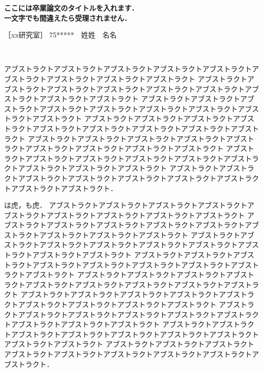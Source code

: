 \documentclass[a4paper,fleqn,12pt]{jreport}
\begin{document}
\begin{center}
\fontsize{16pt}{0pt}\selectfont
{\gtfamily\bfseries ここには卒業論文のタイトルを入れます．\\ 一文字でも間違えたら受理されません．}
\end{center}

\noindent
［xx研究室］ \hfill 75*****　姓姓　名名

\ 

アブストラクトアブストラクトアブストラクトアブストラクトアブストラクトアブストラクトアブストラクトアブストラクトアブストラクト
アブストラクトアブストラクトアブストラクトアブストラクトアブストラクトアブストラクトアブストラクトアブストラクトアブストラクト
アブストラクトアブストラクトアブストラクトアブストラクトアブストラクトアブストラクトアブストラクトアブストラクトアブストラクト
アブストラクトアブストラクトアブストラクトアブストラクトアブストラクトアブストラクトアブストラクトアブストラクトアブストラクト
アブストラクトアブストラクトアブストラクトアブストラクトアブストラクトアブストラクトアブストラクトアブストラクトアブストラクト
アブストラクトアブストラクトアブストラクトアブストラクトアブストラクトアブストラクトアブストラクトアブストラクトアブストラクト
アブストラクトアブストラクトアブストラクトアブストラクトアブストラクトアブストラクトアブストラクトアブストラクトアブストラクト．

は虎，も虎．
アブストラクトアブストラクトアブストラクトアブストラクトアブストラクトアブストラクトアブストラクトアブストラクトアブストラクト
アブストラクトアブストラクトアブストラクトアブストラクトアブストラクトアブストラクトアブストラクトアブストラクトアブストラクト
アブストラクトアブストラクトアブストラクトアブストラクトアブストラクトアブストラクトアブストラクトアブストラクトアブストラクト
アブストラクトアブストラクトアブストラクトアブストラクトアブストラクトアブストラクトアブストラクトアブストラクトアブストラクト
アブストラクトアブストラクトアブストラクトアブストラクトアブストラクトアブストラクトアブストラクトアブストラクトアブストラクト
アブストラクトアブストラクトアブストラクトアブストラクトアブストラクトアブストラクトアブストラクトアブストラクトアブストラクト
アブストラクトアブストラクトアブストラクトアブストラクトアブストラクトアブストラクトアブストラクトアブストラクトアブストラクト
アブストラクトアブストラクトアブストラクトアブストラクトアブストラクトアブストラクトアブストラクトアブストラクトアブストラクト
アブストラクトアブストラクトアブストラクトアブストラクトアブストラクトアブストラクトアブストラクトアブストラクトアブストラクト．
\end{document}
